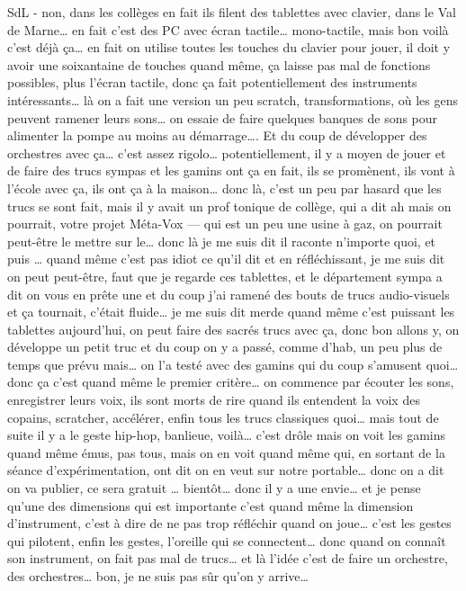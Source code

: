SdL - non, dans les collèges en fait ils filent des tablettes avec clavier, dans le Val de Marne… en fait c'est des PC avec écran tactile… mono-tactile, mais bon voilà c'est déjà ça… en fait on utilise toutes les touches du clavier pour jouer, il doit y avoir une soixantaine de touches quand même, ça laisse pas mal de fonctions possibles, plus l'écran tactile, donc ça fait potentiellement des instruments intéressants… là on a fait une version un peu scratch, transformations, où les gens peuvent ramener leurs sons… on essaie de faire quelques banques de sons pour alimenter la pompe au moins au démarrage…. Et du coup de développer des orchestres avec ça… c'est assez rigolo… potentiellement, il y a moyen de jouer et de faire des trucs sympas et les gamins ont ça en fait, ils se promènent, ils vont à l'école avec ça, ils ont ça à la maison… donc là, c'est un peu par hasard que les trucs se sont fait, mais il y avait un prof tonique de collège, qui a dit ah mais on pourrait, votre projet Méta-Vox — qui est un peu une usine à gaz, on pourrait peut-être le mettre sur le… donc là je me suis dit il raconte n'importe quoi, et puis … quand même c'est pas idiot ce qu'il dit et en réfléchissant, je me suis dit on peut peut-être, faut que je regarde ces tablettes, et le département sympa a dit on vous en prête une et du coup j'ai ramené des bouts de trucs audio-visuels et ça tournait, c'était fluide… je me suis dit merde quand même c'est puissant les tablettes aujourd'hui, on peut faire des sacrés trucs avec ça, donc bon allons y, on développe un petit truc et du coup on y a passé, comme d'hab, un peu plus de temps que prévu mais… on l'a testé avec des gamins qui du coup s'amusent quoi… donc ça c'est quand même le premier critère… on commence par écouter les sons, enregistrer leurs voix, ils sont morts de rire quand ils entendent la voix des copains, scratcher, accélérer, enfin tous les trucs classiques quoi… mais tout de suite il y a le geste hip-hop, banlieue, voilà… c'est drôle mais on voit les gamins quand même émus, pas tous, mais on en voit quand même qui, en sortant de la séance d'expérimentation, ont dit on en veut sur notre portable… donc on a dit on va publier, ce sera gratuit … bientôt… donc il y a une envie… et je pense qu'une des dimensions qui est importante c'est quand même la dimension d'instrument, c'est à dire de ne pas trop réfléchir quand on joue… c'est les gestes qui pilotent, enfin les gestes, l'oreille qui se connectent… donc quand on connaît son instrument, on fait pas mal de trucs… et là l'idée c'est de faire un orchestre, des orchestres… bon, je ne suis pas sûr qu'on y arrive… 

